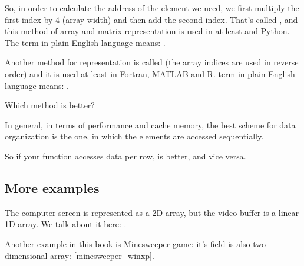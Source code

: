 
So, in order to calculate the address of the element we need, we first multiply the first index by
4 (array width) and then add the second index.
That's called , 
and this method of array and matrix representation is used in at least \CCpp and Python. 
The term  
in plain English language means: .

Another method for representation is called  (the array indices are used in reverse order) 
and it is used at least in Fortran, MATLAB and R. 
 term in plain English language means: .

Which method is better?

In general, in terms of performance and cache memory, 
the best scheme for data organization is the one,
in which the elements are accessed sequentially.

So if your function accesses data per row,  is better, and vice versa.





\subsection{More examples}

The computer screen is represented as a 2D array, but the video-buffer is a linear 1D array. 
We talk about it here: .

Another example in this book is Minesweeper game: it's field is also two-dimensional array: \ref{minesweeper_winxp}.


